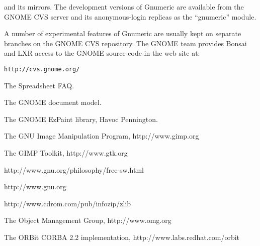 \documentclass[12pt,twoside,twocolumn]{article}
\begin{document}
and its mirrors.  The development versions of Gnumeric are available
from the GNOME CVS server and its anonymous-login replicas as the
``gnumeric'' module.  

A number of experimental features of Gnumeric are usually kept on
separate branches on the GNOME CVS repository.  The GNOME team
provides Bonsai and LXR access to the GNOME source code in the web
site at:

\begin{center}\small
{\texttt {http://cvs.gnome.org/}}
\end{center}



\noindent
[sfaq] The Spreadsheet FAQ.

\noindent
[baboon] The GNOME document model.

\noindent
[ezpaint] The GNOME EzPaint library, Havoc Pennington.

\noindent
[GIMP] The GNU Image Manipulation Program, http://www.gimp.org

\noindent
[GTK+] The GIMP Toolkit, http://www.gtk.org

\noindent
[gnufree] http://www.gnu.org/philosophy/free-sw.html

\noindent
[guile] http://www.gnu.org

\noindent
[libz] http://www.cdrom.com/pub/infozip/zlib

\noindent
[omg] The Object Management Group, http://www.omg.org

\noindent
[orbit] The ORBit CORBA 2.2 implementation,
http://www.labs.redhat.com/orbit 
\end{document}
